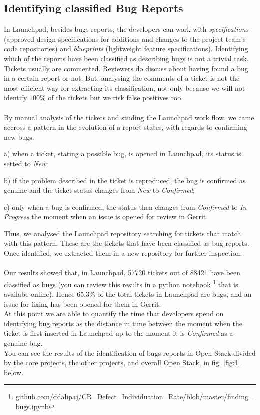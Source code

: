 \documentclass[ifip]{svmult}
\begin{document}
\subsection{Identifying classified Bug Reports}
\label{sec:4.1}

In Launchpad, besides bugs reports, the developers can work with \textit{specifications} 
(approved design specifications for additions and changes to the project team’s code repositories) 
and \textit{blueprints} (lightweight feature specifications).
Identifying which of the reports have been classified as describing bugs is not a trivial task.
Tickets usually are commented. Reviewers do discuss about having found a bug in a certain report or not. 
But, analysing the comments of a ticket is not the most efficient way for extracting its classification, 
not only because we will not identify 100\% of the tickets but we risk false positives too.
\\
\\
By manual analysis of the tickets and studing the Launchpad work flow, we came accross a pattern 
in the evolution of a report states, with regards to confirming new bugs:

\begin{list}{}{}

\item[$\space$] a) when a ticket, stating a possible bug, is opened in Launchpad, its status is setted to 
\textit{New};
\item[$\space$] b) if the problem described in the ticket is reproduced, the bug is confirmed as genuine and the 
ticket status changes from \textit{New} to \textit{Confirmed};
\item[$\space$] c) only when a bug is confirmed, the status then changes from \textit{Confirmed} to \textit{In Progress} 
the moment when an issue is opened for review in Gerrit.
    
\end{list}
Thus, we analysed the Launchpad repository searching for tickets that match with this pattern. 
These are the tickets that have been classified as bug reports. Once identified, we extracted them in a new repository for further 
inspection.   
\\
\\
Our results showed that, in Launchpad, 57720 tickets out of 88421 have been classified as bugs 
(you can review this results in a python notebook
\footnote{github.com/ddalipaj/CR\_Defect\_Individuation\_Rate/blob/master/finding\_bugs.ipynb} 
that is availabe online). 
Hence 65.3\% of the total tickets in Launchpad are bugs, and an issue for fixing has been opened for them in Gerrit. 
\\
At this point we are able to quantify the time that developers spend on identifying bug reports as the 
distance in time between 
the moment when the ticket is first inserted in Launchpad up to the moment it is 
\textit{Confirmed} as a genuine bug.
\\
You can see the results of the identification of bugs reports in Open Stack divided by the core projects, 
the other projects, and overall Open Stack, in fig. \ref{fig:1} below.
\end{document}
